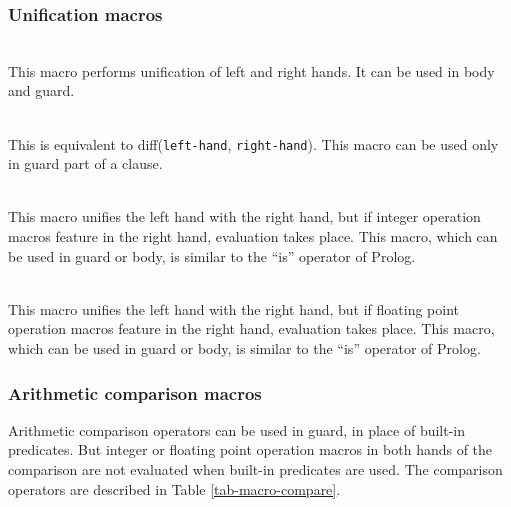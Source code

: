 \subsubsection{Unification macros}
\begin{itemize}

\\ \index{\verb|=|}
This macro performs unification of left and right hands. It can be used in
body and guard.

\\ \index{\verb|\=|}
This is equivalent to diff(\verb|left-hand|, \verb|right-hand|).
This macro can be used only in guard part of a clause.

\\ \index{\verb|:=|}
This macro unifies the left hand with the right hand, but if integer operation
macros feature in the right hand, evaluation takes place. This macro, which can
be used in guard or body, is similar to the ``is'' operator of Prolog.

\\ \index{\verb|$:=|}
This macro unifies the left hand with the right hand, but if floating point
operation macros feature in the right hand, evaluation takes place.
This macro, which can be used in guard or body, is similar to
the ``is'' operator of Prolog.
\end{itemize}

\subsubsection{Arithmetic comparison macros}

Arithmetic comparison operators can be used in guard, in place of built-in
predicates. But integer or floating point operation macros in both hands of
the comparison are not evaluated when built-in predicates are used.
The comparison operators are described in Table \ref{tab-macro-compare}.

